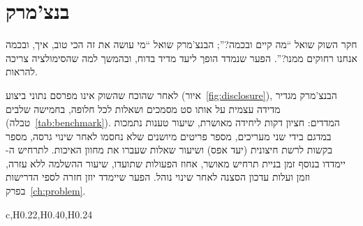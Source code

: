 \section{בנצ'מרק}\label{sec:bench}
\begin{pcguide}
חקר השוק שואל “מה קיים ובכמה?”; הבנצ'מרק שואל “מי עושה את זה הכי טוב, איך, ובכמה אנחנו רחוקים ממנו?”.
הפער שנמדד הופך ליעד מדיד בדוח, ובהמשך למה שהסימולציה צריכה להראות.
\end{pcguide}
לאחר שהוכח שהשוק אינו מפרסם נתוני ביצוע (איור~\ref{fig:disclosure}), הבנצ'מרק מגדיר מדידה עצמית על אותו סט מסמכים ושאלות לכל
חלופה, בחמישה שלבים (טבלה~\ref{tab:benchmark}). המדדים: חציון דקות ליחידה מאושרת, שיעור טענות נתמכות במדגם בידי שני
מעריכים, מספר פריטים מיושנים שלא נחסמו לאחר שינוי גרסה, מספר בקשות לרשת חיצונית (יעד אפס) ושיעור שאלות שעברו את מחוון האיכות.
לתרחיש ה- יימדדו בנוסף זמן בניית תרחיש מאושר, אחוז הפעולות שתועדו, שיעור ההשלמה ללא עזרה, וזמן ועלות עדכון הסצנה לאחר
שינוי נוהל. הפער שיימדד יוזן חזרה לספי הדרישות בפרק~\ref{ch:problem}.
\begin{table}[!htbp]
\centering
\caption{חמשת שלבי הבנצ'מרק}\label{tab:benchmark}
\begin{pctable}{c,H{0.22},H{0.40},H{0.24}}
\end{pctable}
\end{table}
